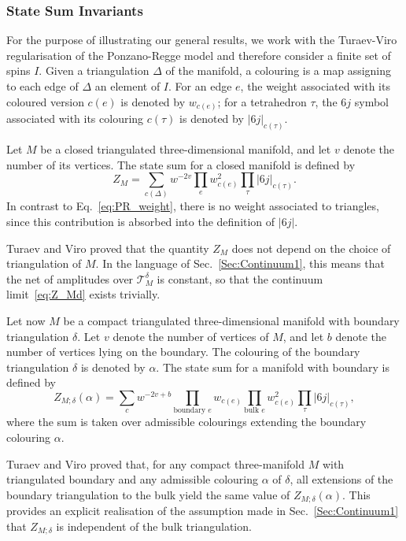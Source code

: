 \documentclass[11pt]{article}
\theoremstyle{definition}
\numberwithin{equation}{section}
\begin{document}
\subsubsection{State Sum Invariants}\label{sec:invariants}

For the purpose of illustrating our general results, we work with the Turaev-Viro regularisation of the Ponzano-Regge model and therefore consider a finite set of spins $I$. Given a triangulation $\Delta$ of the manifold, a colouring is a map assigning to each edge of $\Delta$ an element of $I$. For an edge $e$, the weight associated with its coloured version $c(e)$ is denoted by $w_{c(e)}$; for a tetrahedron $\tau$, the $6j$ symbol associated with its colouring $c(\tau)$ is denoted by $|6j|_{c(\tau)}$.

Let $M$ be a closed triangulated three-dimensional manifold, and let $v$ denote the number of its vertices. The state sum for a closed manifold is defined by
\begin{equation}
\label{eq:TV_closed}
Z_M = \sum_{c(\Delta)} w^{-2v} \prod_{e} w_{c(e)}^2 \prod_{\tau} |6j|_{c(\tau)} .
\end{equation}
In contrast to Eq.~\eqref{eq:PR_weight}, there is no weight associated to triangles, since this contribution is absorbed into the definition of $|6j|$.

Turaev and Viro proved that the quantity $Z_M$ does not depend on the choice of triangulation of $M$. In the language of Sec.~\ref{Sec:Continuum1}, this means that the net of amplitudes over $\mathcal T_M^\delta$ is constant, so that the continuum limit~\eqref{eq:Z_Md} exists trivially.

Let now $M$ be a compact triangulated three-dimensional manifold with boundary triangulation $\delta$. Let $v$ denote the number of vertices of $M$, and let $b$ denote the number of vertices lying on the boundary. The colouring of the boundary triangulation $\delta$ is denoted by $\alpha$. The state sum for a manifold with boundary is defined by
\begin{equation}
\label{eq:TV_open}
Z_{M;\delta}(\alpha) =
\sum_{c}
w^{-2v+b}
\prod_{\text{boundary } e} w_{c(e)}
\prod_{\text{bulk } e} w_{c(e)}^2
\prod_{\tau} |6j|_{c(\tau)},
\end{equation}
where the sum is taken over admissible colourings extending the boundary colouring $\alpha$.

Turaev and Viro proved that, for any compact three-manifold $M$ with triangulated boundary and any admissible colouring $\alpha$ of $\delta$, all extensions of the boundary triangulation to the bulk yield the same value of $Z_{M;\delta}(\alpha)$. This provides an explicit realisation of the assumption made in Sec.~\ref{Sec:Continuum1} that $Z_{M;\delta}$ is independent of the bulk triangulation.
\end{document}
